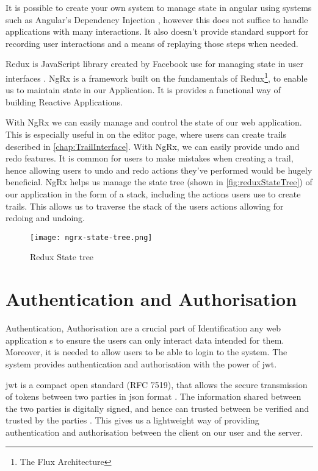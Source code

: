 It is possible to create your own system to manage state in angular using systems such as Angular's Dependency Injection \cite{wiki:DependencyInjection}, however this does not suffice to handle applications with many interactions. It also doesn't provide standard support for recording user interactions and a means of replaying those steps when needed.

Redux is JavaScript library created by Facebook use for managing state in user interfaces \cite{wiki:Redux}. NgRx \cite{cheng2018state} is a framework built on the fundamentals of Redux\footnote{The Flux Architecture}, to enable us to maintain state in our Application. It is provides a functional way of building Reactive Applications.

With NgRx we can easily manage and control the state of our web application. This is especially useful in on the editor page, where users can create trails described in \autoref{chap:TrailInterface}. With NgRx, we can easily provide undo and redo features. It is common for users to make mistakes when creating a trail, hence allowing users to undo and redo actions they've performed would be hugely beneficial. NgRx helps us manage the state tree (shown in \autoref{fig:reduxStateTree}) of our application in the form of a stack, including the actions users use to create trails. This allows us to traverse the stack of the users actions allowing for redoing and undoing.

\begin{figure}[htb!]
    \centering
    \texttt{[image: ngrx-state-tree.png]}
    \caption{Redux State tree}
    \label{fig:reduxStateTree}
\end{figure}

\section{Authentication and Authorisation}
Authentication, Authorisation  are a crucial part of Identification any web application s to ensure the users can only interact data intended for them. Moreover, it is needed to allow users to be able to login to the system. The system provides authentication and authorisation with the power of \acrfull{jwt}.

\acrshort{jwt} is a compact open standard (RFC 7519), that allows the secure transmission of tokens between two parties in  \acrshort{json} format \cite{jones2015json}. The information shared between the two parties is digitally signed, and hence can trusted between be verified and trusted by the parties \cite{auth02019json}. This gives us a lightweight way of providing authentication and authorisation between the client on our user and the server.

